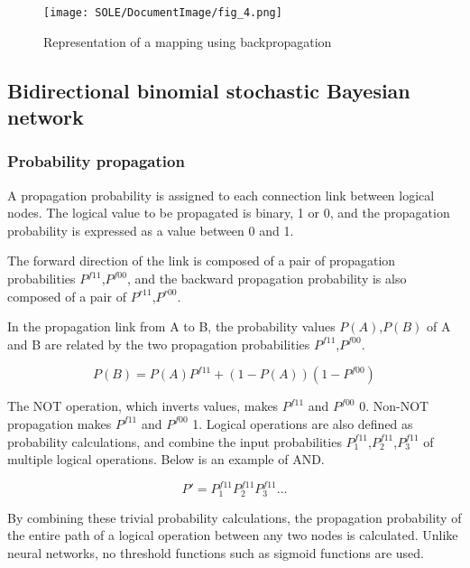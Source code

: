 \documentclass[12pt]{article}
\begin{document}
\begin{figure}[ht]
  \centering
  \texttt{[image: SOLE/DocumentImage/fig\_4.png]}
  \caption{Representation of a mapping using backpropagation}
  \label{fig:Representation of a mapping using backpropagation}
\end{figure}

\subsection{Bidirectional binomial stochastic Bayesian network}\label{bidirectional-binomial-stochastic-bayesian-network}

\subsubsection{Probability propagation}\label{probability-propagation}

A propagation probability is assigned to each connection link between
logical nodes. The logical value to be propagated is binary, 1 or 0, and
the propagation probability is expressed as a value between 0 and 1.

The forward direction of the link is composed of a pair of propagation
probabilities \(P^{f11}\),\(P^{f00}\), and the backward propagation
probability is also composed of a pair of \(P^{r11}\),\(P^{r00}\).

In the propagation link from A to B, the probability values
\hspace{0pt}\hspace{0pt}\(P(A)\),\(P(B)\) of A and B are related by the
two propagation probabilities \(P^{f11}\),\(P^{f00}\).

\[P(B)=P(A) P^{f11} +(1-P(A))(1-P^{f00})\]

The NOT operation, which inverts values, makes \(P^{f11}\) and
\(P^{f00}\) 0. Non-NOT propagation makes \(P^{f11}\) and \(P^{f00}\) 1.
Logical operations are also defined as probability calculations, and
combine the input probabilities
\(P^{f11}_{1}\),\(P^{f11}_{2}\),\(P^{f11}_{3}\) of multiple logical
operations. Below is an example of AND.

\[P'=P^{f11}_{1} P^{f11}_{2} P^{f11}_{3}... \]

By combining these trivial probability calculations, the propagation
probability of the entire path of a logical operation between any two
nodes is calculated. Unlike neural networks, no threshold functions such
as sigmoid functions are used.
\end{document}
